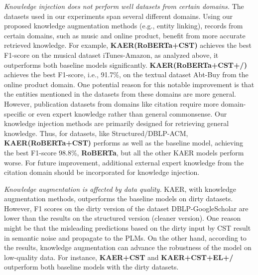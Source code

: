 \textit{Knowledge injection does not perform well datasets from certain domains.}
The datasets used in our experiments span several different domains. Using our proposed knowledge augmentation methods (e.g., entity linking), records from certain domains, such as music and online product, benefit from more accurate retrieved knowledge. For example, \textbf{KAER(RoBERTa+CST)} achieves the best F1-score on the musical dataset iTunes-Amazon, as analyzed above, it outperforms both baseline models significantly. \textbf{KAER(RoBERTa+CST+/)} achieves the best F1-score, i.e., 91.7\%, on the textual dataset Abt-Buy from the online product domain. One potential reason for this notable improvement is that the entities mentioned in the datasets from these domains are more general.
However, publication datasets from domains like citation require more domain-specific or even expert knowledge rather than general commonsense. Our knowledge injection methods are primarily designed for retrieving general knowledge. Thus, for datasets, like Structured/DBLP-ACM, \textbf{KAER(RoBERTa+CST)} performs as well as the baseline model, achieving the best F1-score 98.8\%, \textbf{RoBERTa}, but all the other KAER models perform worse. For future improvement, additional external expert knowledge from the citation domain should be incorporated for knowledge injection. 

\textit{Knowledge augmentation is affected by data quality.}
KAER, with knowledge augmentation methods, outperforms the baseline models on dirty datasets. However, F1 scores on the dirty version of the dataset DBLP-GoogleScholar are lower than the results on the structured version (cleaner version). One reason might be that the misleading predictions based on the dirty input by CST result in semantic noise and propagate to the PLMs.
On the other hand, according to the results, knowledge augmentation can advance the robustness of the model on low-quality data. For instance, \textbf{KAER+CST} and \textbf{KAER+CST+EL+/} outperform both baseline models with the dirty datasets.


 




